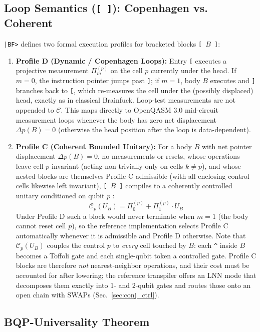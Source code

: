 \documentclass[11pt,a4paper,twocolumn]{article}
\begin{document}
\subsection{Loop Semantics (\texttt{[ ]}): Copenhagen vs. Coherent}
\texttt{|BF>} defines two formal execution profiles for bracketed blocks \texttt{[ $B$ ]}:
\begin{enumerate}
    \item \textbf{Profile D (Dynamic / Copenhagen Loops):} Entry \texttt{[} executes a projective measurement $\Pi_m^{(p)}$ on the cell $p$ currently under the head. If $m=0$, the instruction pointer jumps past \texttt{]}; if $m=1$, body $B$ executes and \texttt{]} branches back to \texttt{[}, which re-measures the cell under the (possibly displaced) head, exactly as in classical Brainfuck. Loop-test measurements are not appended to $\mathcal{C}$. This maps directly to OpenQASM 3.0 \cite{cross2022openqasm3} mid-circuit measurement loops whenever the body has zero net displacement $\Delta p(B) = 0$ (otherwise the head position after the loop is data-dependent).
    \item \textbf{Profile C (Coherent Bounded Unitary):} For a body $B$ with net pointer displacement $\Delta p(B) = 0$, no measurements or resets, whose operations leave cell $p$ invariant (acting non-trivially only on cells $k \neq p$), and whose nested blocks are themselves Profile C admissible (with all enclosing control cells likewise left invariant), \texttt{[ $B$ ]} compiles to a coherently controlled unitary conditioned on qubit $p$ \cite{barenco1995elementary}:
    \begin{equation}
        \mathcal{C}_p(U_B) = \Pi_0^{(p)} + \Pi_1^{(p)} \cdot U_B
    \end{equation}
    Under Profile D such a block would never terminate when $m = 1$ (the body cannot reset cell $p$), so the reference implementation selects Profile C automatically whenever it is admissible and Profile D otherwise. Note that $\mathcal{C}_p(U_B)$ couples the control $p$ to \emph{every} cell touched by $B$: each \texttt{\^{}} inside $B$ becomes a Toffoli gate and each single-qubit token a controlled gate. Profile C blocks are therefore \emph{not} nearest-neighbor operations, and their cost must be accounted for after lowering; the reference transpiler offers an LNN mode that decomposes them exactly into 1- and 2-qubit gates and routes those onto an open chain with SWAPs (Sec.~\ref{sec:conj_ctrl}).
\end{enumerate}

\subsection{BQP-Universality Theorem}
\label{sec:bqp_proof}
\end{document}
